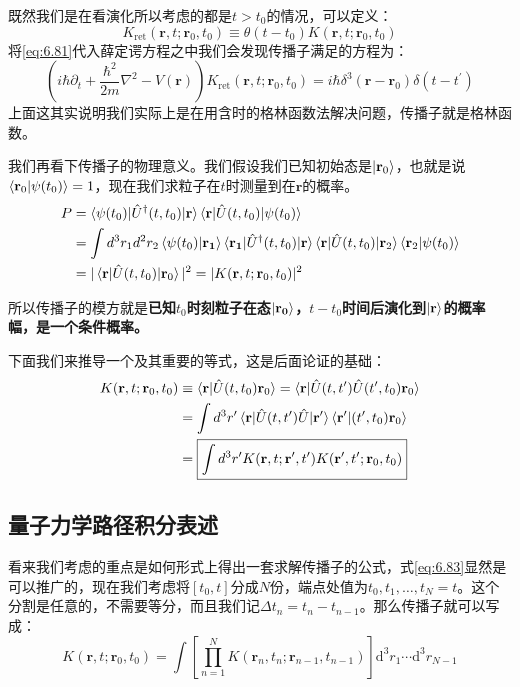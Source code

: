 \documentclass[a4paper,zihao=-4,linespread=1]{ctexrep}
\begin{document}
	既然我们是在看演化所以考虑的都是$t>t_0$的情况，可以定义：
	\[K_{\mathrm{ret }}\left(\mathbf{r} , t ; \mathbf{r}_0, t_{0}\right)\equiv\theta\left(t-t_{0}\right) K\left(\mathbf{r} , t ; \mathbf{r}_0, t_{0}\right)\]
	将\ref{eq:6.81}代入薛定谔方程之中我们会发现传播子满足的方程为：
	\[\left(i \hbar \partial_{t}+\frac{\hbar^{2}}{2 m} \nabla^{2}-V(\mathbf{r})\right)K_{\mathrm{ret }}\left(\mathbf{r} , t ; \mathbf{r}_0, t_{0}\right)=i \hbar \delta^{3}\left(\mathbf{r}-\mathbf{r}_0 \right) \delta\left(t-t^{\prime}\right)\]
	上面这其实说明我们实际上是在用含时的格林函数法解决问题，传播子就是格林函数。
	
	我们再看下传播子的物理意义。我们假设我们已知初始态是$\ket{\mathbf{r}_0}$，也就是说$\braket{\mathbf{r}_0|\psi(t_0)}=1$，现在我们求粒子在$t$时测量到在$\mathbf{r}$的概率。
	\begin{align*}
		P&=\braket{\psi(t_0)|\hat{U}^\dagger(t,t_0)|\mathbf{r}}\braket{\mathbf{r}|\hat{U}(t,t_0)|\psi(t_0)}\\
		&=\int d^3r_1d^2r_2 \braket{\psi(t_0)|\mathbf{r_1}}\braket{\mathbf{r_1}|\hat{U}^\dagger(t,t_0)|\mathbf{r}}\braket{\mathbf{r}|\hat{U}(t,t_0)|\mathbf{r}_2}\braket{\mathbf{r}_2|\psi(t_0)}\\
		&=|\braket{\mathbf{r}|\hat{U}(t,t_0)|\mathbf{r}_0}|^2=	|K(\mathbf{r},t;\mathbf{r}_0,t_0)|^2
	\end{align*}

	所以传播子的模方就是\textbf{已知$t_0$时刻粒子在态$\ket{\mathbf{r_0}}$，$t-t_0$时间后演化到$\ket{\mathbf{r}}$的概率幅，是一个条件概率。}
	
	下面我们来推导一个及其重要的等式，这是后面论证的基础：
	\begin{equation}
		\label{eq:6.83}
		\begin{aligned}
		K(\mathbf{r},t;\mathbf{r}_0,t_0)&\equiv \braket{\mathbf{r}|\hat {U}(t,t_0)\mathbf{r}_0}	= \braket{\mathbf{r}|\hat {U}(t,t^\prime)\hat {U}(t^\prime,t_0)\mathbf{r}_0}\\
		&=\int d^3r^\prime \braket{\mathbf{r}|\hat {U}(t,t^\prime)\hat {U}|\mathbf{r^\prime}}\braket{\mathbf{r^\prime}|(t^\prime,t_0)\mathbf{r}_0}\\
		&=\boxed{	\int  d^3r^\prime K(\mathbf{r},t;\mathbf{r}^\prime,t^\prime)	K(\mathbf{r}^\prime,t^\prime;\mathbf{r}_0,t_0)}
		\end{aligned}
	\end{equation}
	
	\subsection*{量子力学路径积分表述}
	看来我们考虑的重点是如何形式上得出一套求解传播子的公式，式\ref{eq:6.83}显然是可以推广的，现在我们考虑将$[t_0,t]$分成$N$份，端点处值为$t_0,t_1,\ldots,t_N=t$。这个分割是任意的，不需要等分，而且我们记$\Delta t_n=t_n-t_{n-1}$。那么传播子就可以写成：
	\begin{equation}
		K\left(\mathbf{r}, t ; \mathbf{r}_{0}, t_{0}\right)=\int\left[\prod_{n=1}^{N} K\left(\mathbf{r}_{n}, t_{n} ; \mathbf{r}_{n-1}, t_{n-1}\right)\right] \mathrm{d}^3{r}_1 \cdots \mathrm{d}^3{r}_{N-1}
	\end{equation}
	
\end{document}
